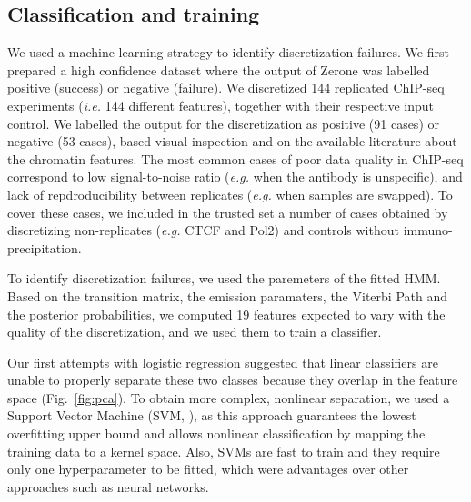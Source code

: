 \documentclass{bioinfo}
\begin{document}
\begin{methods}
\subsection{Classification and training}
\label{sub:training}
We used a machine learning strategy to identify discretization
failures. We first prepared a high confidence dataset where the
output of Zerone was labelled positive (success) or negative (failure).
We discretized 144 replicated ChIP-seq experiments (\textit{i.e.}
144 different features), together with their respective input control.
We labelled the output for the discretization as positive (91 cases)
or negative (53 cases), based visual inspection and on the available
literature about the chromatin features. The most common cases of
poor data quality in ChIP-seq correspond to low signal-to-noise ratio
(\textit{e.g.} when the antibody is unspecific), and lack of
repdroducibility between replicates (\textit{e.g.} when samples are
swapped). To cover these cases, we included in the trusted set
a number of cases obtained by discretizing non-replicates
(\textit{e.g.} CTCF and Pol2) and controls without
immuno-precipitation.

To identify discretization failures, we used the paremeters of the
fitted HMM. Based on the transition matrix, the emission paramaters,
the Viterbi Path and the posterior probabilities,
we computed 19 features expected to vary with the quality
of the discretization, and we used them to train a classifier.

Our first attempts with logistic regression suggested that linear
classifiers are unable to properly separate these two classes because
they overlap in the feature space (Fig.~\ref{fig:pca}). To obtain more
complex, nonlinear separation, we used a Support Vector Machine
(SVM, \cite{Chang2011,e1071}), as this approach guarantees the lowest
overfitting upper bound and allows nonlinear classification by mapping
the training data to a kernel space. Also, SVMs are fast to train and
they require only one hyperparameter to be fitted, which were
advantages over other approaches such as neural networks.


\end{methods}
\end{document}
